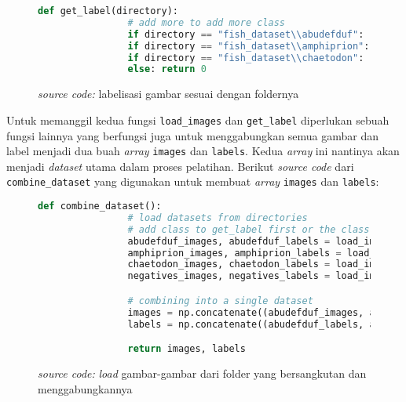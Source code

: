 	\begin{figure}[H]
		\begin{lstlisting}[language=Python, basicstyle=\tiny]
			def get_label(directory):
				# add more to add more class
				if directory == "fish_dataset\\abudefduf": return 1
				if directory == "fish_dataset\\amphiprion": return 2
				if directory == "fish_dataset\\chaetodon": return 3
				else: return 0
		\end{lstlisting}
		\caption{\emph{source code:} labelisasi gambar sesuai dengan foldernya}
		\label{code:labeling}
	\end{figure}

	Untuk memanggil kedua fungsi \texttt{load\_images} dan \texttt{get\_label} diperlukan sebuah fungsi lainnya 
	yang berfungsi juga untuk menggabungkan semua gambar dan label menjadi dua buah \emph{array} 
	\texttt{images} dan \texttt{labels}. Kedua \emph{array} ini nantinya akan menjadi \textit{dataset} utama 
	dalam proses pelatihan. Berikut \emph{source code} dari \texttt{combine\_dataset} yang 
	digunakan untuk membuat \textit{array} \texttt{images} dan \texttt{labels}:

	\begin{figure}[H]
		\begin{lstlisting}[language=Python, basicstyle=\tiny]
			def combine_dataset():
				# load datasets from directories
				# add class to get_label first or the class will be considered a negative example
				abudefduf_images, abudefduf_labels = load_images("fish_dataset\\abudefduf")
				amphiprion_images, amphiprion_labels = load_images("fish_dataset\\amphiprion")
				chaetodon_images, chaetodon_labels = load_images("fish_dataset\\chaetodon")
				negatives_images, negatives_labels = load_images("fish_dataset\\negative_examples")

				# combining into a single dataset
				images = np.concatenate((abudefduf_images, amphiprion_images, chaetodon_images, negatives_images), axis = 0)
				labels = np.concatenate((abudefduf_labels, amphiprion_labels, chaetodon_labels, negatives_labels), axis = 0)

				return images, labels
		\end{lstlisting}
		\caption{\emph{source code:} \textit{load} gambar-gambar dari folder yang bersangkutan dan 
		menggabungkannya}
		\label{code:conc dataset}
	\end{figure}

